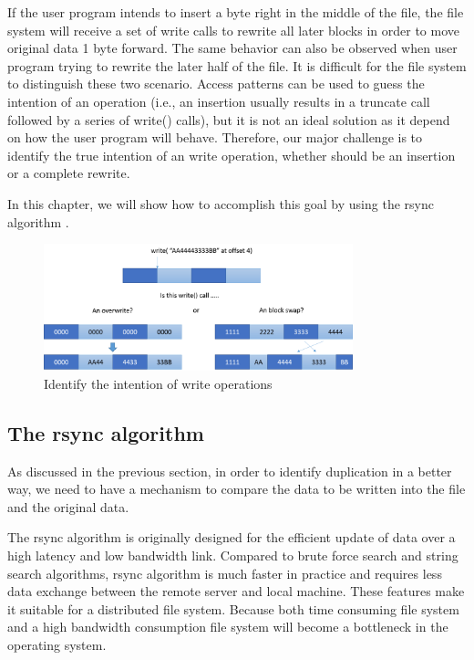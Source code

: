    If the user program intends to insert a byte right in the middle of the file, the file system will receive a set of write calls to rewrite all later blocks in order to move original data 1 byte forward. The same behavior can also be observed when user program trying to rewrite the later half of the file. It is difficult for the file system to distinguish these two scenario. Access patterns can be used to guess the intention of an operation (i.e., an insertion usually results in a truncate call followed by a series of write() calls), but it is not an ideal solution as it depend on how the user program will behave. Therefore, our major challenge is to identify the true intention of an write operation, whether should be an insertion or a complete rewrite.

    In this chapter, we will show how to accomplish this goal by using the rsync algorithm \cite{rsync_alg}.

\begin{figure}[t]
\centering
\includegraphics[width=0.8\textwidth]{Chapter-4/figs/fig6.png}
\caption{Identify the intention of write operations}
\label{fig:write_intention}
\end{figure}

\subsection{The rsync algorithm}

    As discussed in the previous section, in order to identify duplication in a better way, we need to have a mechanism to compare the data to be written into the file and the original data. 
    
    The rsync algorithm is originally designed for the efficient update of data over a high latency and low bandwidth link. Compared to brute force search and string search algorithms, rsync algorithm is much faster in practice and requires less data exchange between the remote server and local machine. These features make it suitable for a distributed file system. Because both time consuming file system and a high bandwidth consumption file system will become a bottleneck in the operating system.

